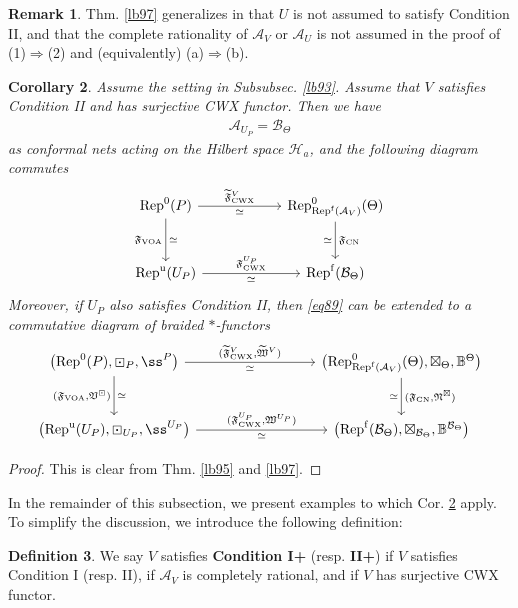 \documentclass[11pt,b5paper,notitlepage]{article}
\theoremstyle{definition}
\newtheorem{df}{Definition}[section]
\newtheorem{rem}[df]{Remark}
\theoremstyle{plain}
\newtheorem{co}[df]{Corollary}
\newcommand{\fk}{\mathfrak}
\newcommand{\mc}{\mathcal}
\newcommand{\wtd}{\widetilde}
\newcommand{\Rep}{\mathrm{Rep}}
\newcommand{\Repf}{\mathrm{Rep}^{\mathrm f}}
\newcommand{\CWX}{{\scriptscriptstyle \mathrm{CWX}}}
\newcommand{\tFVCWX}{{\widetilde{\mathfrak F}^V_{\scriptscriptstyle \mathrm{CWX}}}}
\newcommand{\VOA}{{\scriptscriptstyle \mathrm{VOA}}}
\newcommand{\CN}{{\scriptscriptstyle \mathrm{CN}}}
\newcommand{\RepUP}{\mathrm{Rep}^{\mathrm u}(U_P)}
\numberwithin{equation}{section}
\begin{document}
\begin{rem}
Thm. \ref{lb97} generalizes \cite[Thm. 2.7.2]{Gui20} in that $U$ is not assumed to satisfy Condition II, and that the complete rationality of $\mc A_V$ or $\mc A_U$ is not assumed in the proof of (1)$\Rightarrow$(2) and (equivalently) (a)$\Rightarrow$(b).
\end{rem}


\begin{co}\label{lb117}
Assume the setting in Subsubsec. \ref{lb93}. Assume that $V$ satisfies Condition II and has surjective CWX functor. Then we have
\begin{align*}
\mc A_{U_P}=\mc B_\Theta
\end{align*}
as conformal nets acting on the Hilbert space $\mc H_a$, and the following diagram commutes
\begin{equation}\label{eq89}
\begin{tikzcd}[row sep=large,column sep=2cm]
\Rep^0(P) \arrow[r,"\tFVCWX","\simeq"'] \arrow[d,"{\fk F_\VOA}"',"\simeq"] & \Rep^0_{\Repf(\mc A_V)}(\Theta) \arrow[d,"{\fk F_\CN}","\simeq"'] \\
\RepUP \arrow[r,"{\fk F^{U_P}_\CWX}","\simeq"']           & \Repf(\mc B_\Theta)          
\end{tikzcd}
\end{equation}
Moreover, if $U_P$ also satisfies Condition II, then \eqref{eq89} can be extended to a commutative diagram of braided $*$-functors
\begin{equation}
\begin{tikzcd}[row sep=large,column sep=3cm]
\big(\Rep^0(P),\boxdot_P,\ss^P\big) \arrow[r,"{(\tFVCWX,\wtd{\fk W}^V)}","\simeq"'] \arrow[d,"{(\fk F_\VOA,\fk V^\boxdot)}"',"\simeq"] & \big(\Rep^0_{\Repf(\mc A_V)}(\Theta),\boxtimes_\Theta,\mathbb B^\Theta \big)\arrow[d,"{(\fk F_\CN,\fk N^\boxtimes)}","\simeq"'] \\
\big(\RepUP,\boxdot_{U_P},\ss^{U_P} \big)\arrow[r,"{(\fk F^{U_P}_\CWX,\fk W^{U_P})}","\simeq"']           & \big(\Repf(\mc B_\Theta),\boxtimes_{\mc B_\Theta},\mathbb B^{\mc B_\Theta} \big)         
\end{tikzcd}
\end{equation}
\end{co}

\begin{proof}
This is clear from Thm. \ref{lb95} and \ref{lb97}.
\end{proof}


In the remainder of this subsection, we present examples to which Cor. \ref{lb117} apply. To simplify the discussion, we introduce the following definition:
\begin{df}
We say $V$ satisfies \textbf{Condition I+} (resp. \textbf{II+}) if $V$ satisfies Condition I (resp. II), if $\mc A_V$ is completely rational, and if $V$ has surjective CWX functor. 
\end{df}
\end{document}
